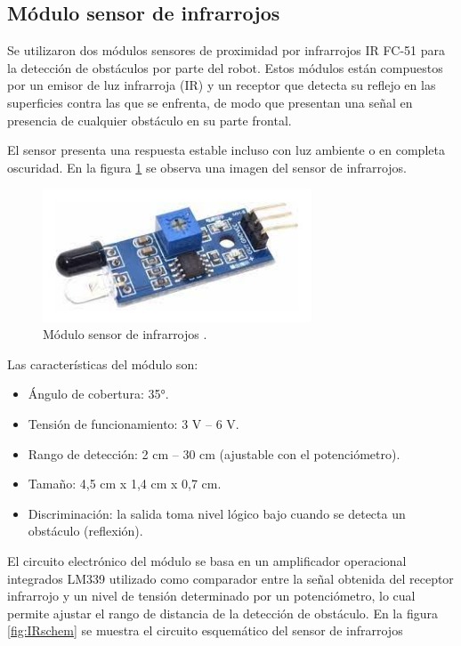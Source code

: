 
\subsection{Módulo sensor de infrarrojos}

Se utilizaron dos módulos sensores de proximidad por infrarrojos IR FC-51 \citep{IR} para la detección de obstáculos por parte del robot. Estos módulos están compuestos por  un emisor de luz infrarroja (IR)  y un receptor que detecta su reflejo en  las superficies contra las que se enfrenta, de modo que presentan una señal en  presencia de cualquier obstáculo en su parte frontal. 

El sensor presenta una respuesta estable incluso con luz ambiente o en completa oscuridad. En la figura \ref{fig:moduloIR} se observa una imagen del sensor de infrarrojos.

\begin{figure}[h]
	\centering
	\includegraphics[width=8cm]{./Figures/moduloIR.jpg}
	\caption{Módulo sensor de infrarrojos \protect\footnotemark.}
	\label{fig:moduloIR}
\end{figure}

Las características del módulo son:
\begin{itemize}
	\item Ángulo de cobertura: 35°.
	\item Tensión de funcionamiento: 3 V – 6 V.
	\item Rango de detección: 2 cm – 30 cm (ajustable con el potenciómetro).
	\item Tamaño: 4,5 cm x 1,4 cm x 0,7 cm. 
	\item Discriminación: la salida toma nivel lógico bajo cuando se detecta un obstáculo (reflexión).
\end{itemize}

El circuito electrónico del módulo se basa en un amplificador operacional integrados LM339 utilizado como comparador entre la señal obtenida del receptor infrarrojo y un nivel de tensión determinado por un potenciómetro, lo cual permite ajustar el rango de distancia de la detección de obstáculo. En la figura \ref{fig:IRschem} se muestra el circuito esquemático del sensor de infrarrojos

